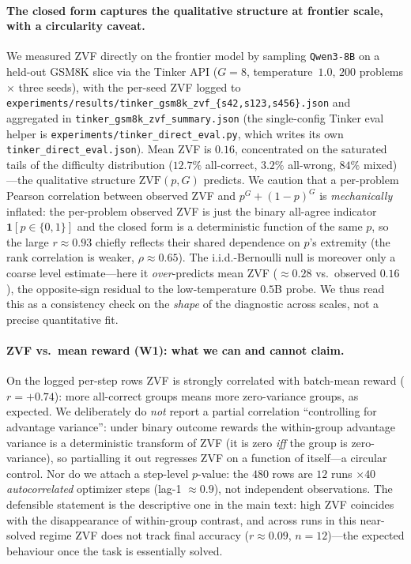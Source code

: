 \documentclass{article}
\begin{document}
\paragraph{The closed form captures the qualitative structure at frontier scale,
with a circularity caveat.} We measured ZVF directly on the frontier model by
sampling \texttt{Qwen3-8B} on a held-out GSM8K slice via the Tinker API
($G{=}8$, temperature~$1.0$, $200$ problems $\times$ three seeds), with the
per-seed ZVF logged to
\texttt{experiments/results/tinker\_gsm8k\_zvf\_\{s42,s123,s456\}.json} and
aggregated in \texttt{tinker\_gsm8k\_zvf\_summary.json} (the single-config Tinker
eval helper is \texttt{experiments/tinker\_direct\_eval.py}, which writes its own
\texttt{tinker\_direct\_eval.json}). Mean ZVF is $0.16$,
concentrated on the saturated tails of the difficulty distribution ($12.7\%$
all-correct, $3.2\%$ all-wrong, $84\%$ mixed)---the qualitative structure
$\mathrm{ZVF}(p,G)$ predicts. We caution that a per-problem Pearson correlation
between observed ZVF and $p^{G}+(1-p)^{G}$ is \emph{mechanically} inflated: the
per-problem observed ZVF is just the binary all-agree indicator
$\mathbf{1}[p \in \{0,1\}]$ and the closed form is a deterministic function of
the same $p$, so the large $r \approx 0.93$ chiefly reflects their shared
dependence on $p$'s extremity (the rank correlation is weaker,
$\rho \approx 0.65$). The i.i.d.-Bernoulli null is moreover only a coarse level
estimate---here it \emph{over}-predicts mean ZVF ($\approx 0.28$ vs.\ observed
$0.16$), the opposite-sign residual to the low-temperature $0.5$B probe. We thus
read this as a consistency check on the \emph{shape} of the diagnostic across
scales, not a precise quantitative fit.

\paragraph{ZVF vs.\ mean reward (W1): what we can and cannot claim.} On the
logged per-step rows ZVF is strongly correlated with batch-mean reward
($r=+0.74$): more all-correct groups means more zero-variance groups, as
expected. We deliberately do \emph{not} report a partial correlation
``controlling for advantage variance'': under binary outcome rewards the
within-group advantage variance is a deterministic transform of ZVF (it is zero
\emph{iff} the group is zero-variance), so partialling it out regresses ZVF on a
function of itself---a circular control. Nor do we attach a step-level
$p$-value: the $480$ rows are $12$ runs $\times 40$ \emph{autocorrelated}
optimizer steps (lag-1 $\approx 0.9$), not independent observations. The
defensible statement is the descriptive one in the main text: high ZVF coincides
with the disappearance of within-group contrast, and across runs in this
near-solved regime ZVF does not track final accuracy ($r\approx 0.09$,
$n{=}12$)---the expected behaviour once the task is essentially solved.
\end{document}
